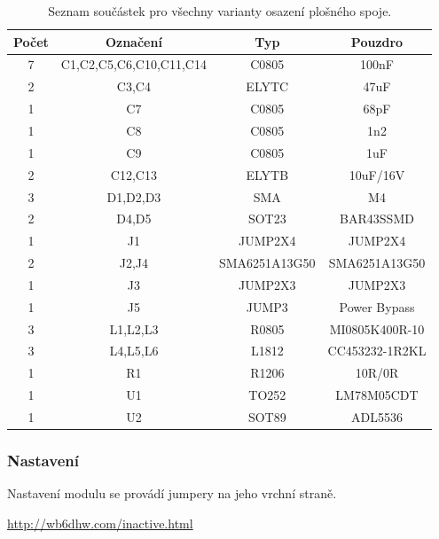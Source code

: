 \documentclass[12pt,a4paper,oneside]{article}
\begin{document}
\begin{savenotes}
\begin{table}[h!]
\begin{center}
\begin{tabular}{ |c|c|c|c| }
\hline 
Počet & Označení & Typ  & Pouzdro  \\ 
\hline 
7	&	C1,C2,C5,C6,C10,C11,C14	&	C0805	&	100nF	\\
2	&	C3,C4	&	ELYTC	&	47uF	\\
1	&	C7	&	C0805	&	68pF	\\
1	&	C8	&	C0805	&	1n2	\\
1	&	C9	&	C0805	&	1uF	\\
2	&	C12,C13	&	ELYTB	&	10uF/16V	\\
3	&	D1,D2,D3	&	SMA	&	M4	\\
2	&	D4,D5	&	SOT23	&	BAR43SSMD	\\
1	&	J1	&	JUMP2X4	&	JUMP2X4	\\
2	&	J2,J4	&	SMA6251A13G50	&	SMA6251A13G50	\\
1	&	J3	&	JUMP2X3	&	JUMP2X3	\\
1	&	J5	&	JUMP3	&	Power Bypass	\\
3	&	L1,L2,L3	&	R0805	&	MI0805K400R-10	\\
3	&	L4,L5,L6	&	L1812	&	CC453232-1R2KL	\\
1	&	R1	&	R1206	&	10R/0R	\\
1	&	U1	&	TO252	&	LM78M05CDT	\\
1	&	U2	&	SOT89	&	ADL5536	\\
\hline 
\end{tabular}
\end{center}
\caption{Seznam součástek pro všechny varianty osazení plošného spoje.}
\label{seznam_soucastek}
\end{table}
\end{savenotes}

\newpage

\subsubsection{Nastavení}
Nastavení modulu se provádí jumpery na jeho vrchní straně. 


\begin{thebibliography}{99}
\href{http://wb6dhw.com/inactive.html}{http://wb6dhw.com/inactive.html}

\end{thebibliography}
\end{document}
